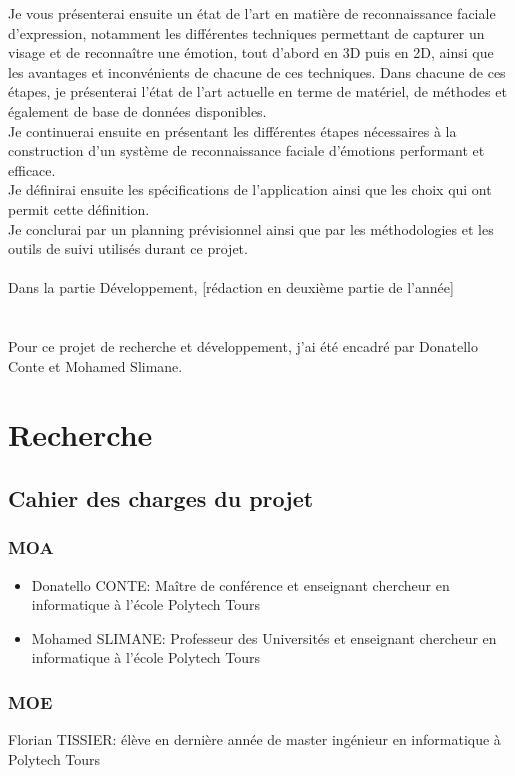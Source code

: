 \documentclass[overfullbox, poster]{polytech/polytech}
\begin{document}
Je vous présenterai ensuite un état de l'art en matière de reconnaissance faciale d'expression, notamment les différentes techniques permettant de capturer un visage et de reconnaître une émotion, tout d'abord en 3D puis en 2D, ainsi que les avantages et inconvénients de chacune de ces techniques. Dans chacune de ces étapes, je présenterai l'état de l'art actuelle en terme de matériel, de méthodes et également de base de données disponibles. \\
Je continuerai ensuite en présentant les différentes étapes nécessaires à la construction d'un système de reconnaissance faciale d'émotions performant et efficace.\\
Je définirai ensuite les spécifications de l'application ainsi que les choix qui ont permit cette définition.\\
Je conclurai par un planning prévisionnel ainsi que par les méthodologies et les outils de suivi utilisés durant ce projet.\\
\\
Dans la partie Développement, [rédaction en deuxième partie de l'année]\\
\\
\\
Pour ce projet de recherche et développement, j'ai été encadré par Donatello Conte et Mohamed Slimane.


\part{Recherche}
\label{part:part_recherche}

\chapter{Cahier des charges du projet}
\label{chap:chap_cdc}

\section{MOA}
\begin{itemize}
\item Donatello CONTE: Maître de conférence et enseignant chercheur en informatique à l'école Polytech Tours
\item Mohamed SLIMANE: Professeur des Universités et enseignant chercheur en informatique à l'école Polytech Tours
\end{itemize}

\section{MOE}
Florian TISSIER: élève en dernière année de master ingénieur en informatique à Polytech Tours
\end{document}

